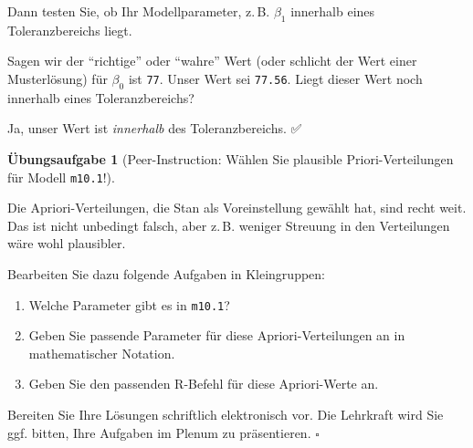 \documentclass[
  ngerman,
  letterpaper,
  twoside,
  open=any]{scrbook}
\newenvironment{Shaded}{\begin{snugshade}}{\end{snugshade}}
\newcommand{\AttributeTok}[1]{\textcolor[rgb]{0.40,0.45,0.13}{#1}}
\newcommand{\CommentTok}[1]{\textcolor[rgb]{0.37,0.37,0.37}{#1}}
\newcommand{\DecValTok}[1]{\textcolor[rgb]{0.68,0.00,0.00}{#1}}
\newcommand{\DocumentationTok}[1]{\textcolor[rgb]{0.37,0.37,0.37}{\textit{#1}}}
\newcommand{\FloatTok}[1]{\textcolor[rgb]{0.68,0.00,0.00}{#1}}
\newcommand{\FunctionTok}[1]{\textcolor[rgb]{0.28,0.35,0.67}{#1}}
\newcommand{\NormalTok}[1]{\textcolor[rgb]{0.00,0.23,0.31}{#1}}
\newcommand{\SpecialCharTok}[1]{\textcolor[rgb]{0.37,0.37,0.37}{#1}}
\providecommand{\tightlist}{%
  \setlength{\itemsep}{0pt}\setlength{\parskip}{0pt}}\usepackage{longtable,booktabs,array}
\theoremstyle{definition}
\theoremstyle{plain}
\theoremstyle{definition}
\newtheorem{exercise}{Übungsaufgabe}[chapter]
\theoremstyle{definition}
\theoremstyle{definition}
\theoremstyle{definition}
\newtheorem{exercise}{Übungsaufgabe}[chapter]
\theoremstyle{remark}
\begin{document}
Dann testen Sie, ob Ihr Modellparameter, z.\,B. \(\beta_1\) innerhalb
eines Toleranzbereichs liegt.

Sagen wir der \enquote{richtige} oder \enquote{wahre} Wert (oder
schlicht der Wert einer Musterlösung) für \(\beta_0\) ist \texttt{77}.
Unser Wert sei \texttt{77.56}. Liegt dieser Wert noch innerhalb eines
Toleranzbereichs?

\begin{Shaded}
\end{Shaded}

Ja, unser Wert ist \emph{innerhalb} des Toleranzbereichs. ✅

\begin{exercise}[Peer-Instruction: Wählen Sie plausible
Priori-Verteilungen für Modell
\texttt{m10.1}!]\protect\hypertarget{exr-peer-m10.1-priors}{}\label{exr-peer-m10.1-priors}

Die Apriori-Verteilungen, die Stan als Voreinstellung gewählt hat, sind
recht weit. Das ist nicht unbedingt falsch, aber z.\,B. weniger Streuung
in den Verteilungen wäre wohl plausibler.

Bearbeiten Sie dazu folgende Aufgaben in Kleingruppen:

\begin{enumerate}
\def\labelenumi{\alph{enumi})}
\tightlist
\item
  Welche Parameter gibt es in \texttt{m10.1}?
\item
  Geben Sie passende Parameter für diese Apriori-Verteilungen an in
  mathematischer Notation.
\item
  Geben Sie den passenden R-Befehl für diese Apriori-Werte an.
\end{enumerate}

Bereiten Sie Ihre Lösungen schriftlich elektronisch vor. Die Lehrkraft
wird Sie ggf. bitten, Ihre Aufgaben im Plenum zu präsentieren.
\(\square\)

\end{exercise}
\end{document}
